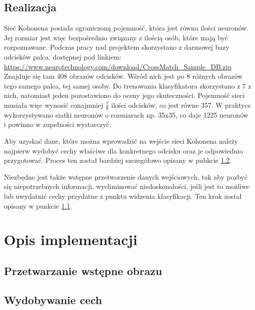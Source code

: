 \documentclass[12pt, notitlepage]{article}
\begin{document}
\subsection{Realizacja}

Sieć Kohonena posiada ograniczoną pojemność, która jest równa ilości neuronów. Jej rozmiar jest więc bezpośrednio związany z ilością osób, które mają być rozpoznawane. Podczas pracy nad projektem skorzystano z darmowej bazy odcisków palca, dostępnej pod linkiem:\newline
{
    \parskip=0pt
        \url{
            https://www.neurotechnology.com/download/CrossMatch_Sample_DB.zip
        }
}
\newline
Znajduje się tam 408 obrazów odcisków. Wśród nich jest po 8 różnych obrazów tego samego palca, tej samej osoby. Do trenowania klasyfikatora skorzystano z 7 z nich, natomiast jeden pozostawiono do oceny jego skuteczności. Pojemność sieci musiała więc wynosić conajmniej \( \frac{7}{8} \) ilości odcisków, co jest równe 357. W praktyce wykorzystywano siatki neuronów o rozmiarach np. 35x35, co daje 1225 neuronów i powinno w zupełności wystarczyć.

Aby uzyskać dane, które można wprowadzić na wejście sieci Kohonena należy najpierw wydobyć cechy właściwe dla konkretnego odcisku oraz je odpowiednio przygotować. Proces ten został bardziej szczegółowo opisany w pubkcie \ref{sec:extraction}.

Niezbędne jest także wstępne przetworzenie danych wejściowych, tak aby pozbyć się niepotrzebnych informacji, wyeliminować niedoskonałości, jeśli jest to możliwe lub uwydatnić cechy przydatne z punktu widzenia klasyfikacji. Ten krok został opisany w punkcie \ref{sec:preprocesing}.

\section{Opis implementacji}

\subsection{Przetwarzanie wstępne obrazu}\label{sec:preprocesing}

\subsection{Wydobywanie cech}\label{sec:extraction}
\end{document}
